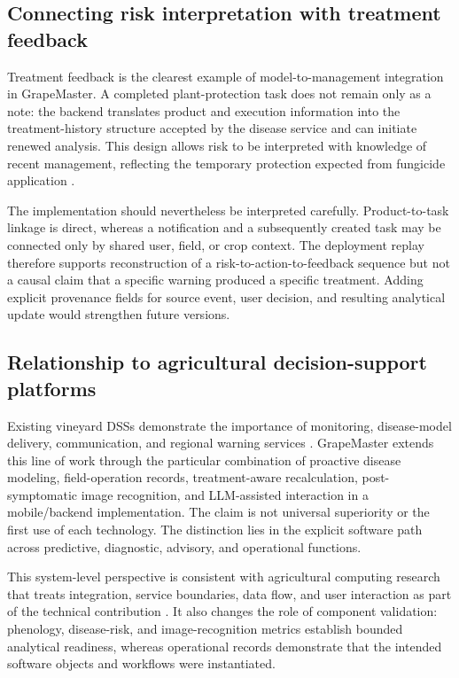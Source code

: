 \documentclass[12pt]{article}
\begin{document}
\subsection{Connecting risk interpretation with treatment feedback}\label{from-analytical-outputs-to-executable-disease-management-records}

Treatment feedback is the clearest example of model-to-management integration in GrapeMaster. A completed plant-protection task does not remain only as a note: the backend translates product and execution information into the treatment-history structure accepted by the disease service and can initiate renewed analysis. This design allows risk to be interpreted with knowledge of recent management, reflecting the temporary protection expected from fungicide application \citep{caffiFungicideModelsAre2018,warnekeEffectFungicideMobility2020}.

The implementation should nevertheless be interpreted carefully. Product-to-task linkage is direct, whereas a notification and a subsequently created task may be connected only by shared user, field, or crop context. The deployment replay therefore supports reconstruction of a risk-to-action-to-feedback sequence but not a causal claim that a specific warning produced a specific treatment. Adding explicit provenance fields for source event, user decision, and resulting analytical update would strengthen future versions.

\subsection{Relationship to agricultural decision-support platforms}\label{relationship-to-existing-platforms}

Existing vineyard DSSs demonstrate the importance of monitoring, disease-model delivery, communication, and regional warning services \citep{rossiAddressingImplementationProblem2014,bregaglioPublicDecisionSupport2022}. GrapeMaster extends this line of work through the particular combination of proactive disease modeling, field-operation records, treatment-aware recalculation, post-symptomatic image recognition, and LLM-assisted interaction in a mobile/backend implementation. The claim is not universal superiority or the first use of each technology. The distinction lies in the explicit software path across predictive, diagnostic, advisory, and operational functions.

This system-level perspective is consistent with agricultural computing research that treats integration, service boundaries, data flow, and user interaction as part of the technical contribution \citep{fountasFarmManagementInformation2015,romera2024digitalization,bakirScalableEndtoendIoT2026}. It also changes the role of component validation: phenology, disease-risk, and image-recognition metrics establish bounded analytical readiness, whereas operational records demonstrate that the intended software objects and workflows were instantiated.
\end{document}
